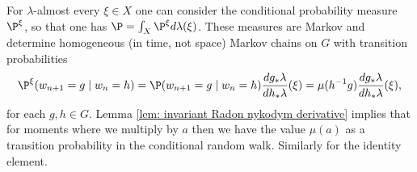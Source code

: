 %


For $\lambda$-almost every $\xi \in X$ one can consider the conditional probability measure $\P^{\xi}$, so that one has $\P=\int_{X}\P^{\xi}d\lambda(\xi)$. These measures are Markov and determine homogeneous (in time, not space) Markov chains on $G$ with transition probabilities
\[
\P^{\xi}(w_{n+1}=g\mid w_n=h)=\P(w_{n+1}=g\mid w_n=h)\frac{dg_{*}\lambda}{dh_{*}\lambda}(\xi)=\mu(h^{-1}g)\frac{dg_{*}\lambda}{dh_{*}\lambda}(\xi),
\]
for each $g,h\in G.$ Lemma \ref{lem: invariant Radon nykodym derivative} implies that for moments where we multiply by $a$ then we have the value $\mu(a)$ as a transition probability in the conditional random walk. Similarly for the identity element.

\begin{rem}
\end{rem}

